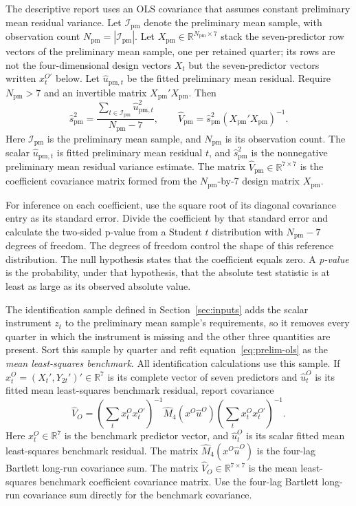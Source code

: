 \documentclass[11pt]{article}
\begin{document}
The descriptive report uses an OLS covariance that assumes constant preliminary mean residual
variance. Let \(\mathcal I_{\mathrm{pm}}\) denote the preliminary mean sample, with observation count
\(N_{\mathrm{pm}}=|\mathcal I_{\mathrm{pm}}|\). Let \(X_{\mathrm{pm}}\in\mathbb R^{N_{\mathrm{pm}}\times7}\) stack the seven-predictor row vectors of the preliminary mean
sample, one per retained quarter; its rows are not the four-dimensional design vectors \(X_t\) but
the seven-predictor vectors written \(x_t^{O\prime}\) below.
Let \(\widehat u_{\mathrm{pm},t}\) be the fitted preliminary mean residual. Require
\(N_{\mathrm{pm}}>7\) and an invertible matrix \(X_{\mathrm{pm}}'X_{\mathrm{pm}}\). Then
\begin{equation*}
 \widehat s_{\mathrm{pm}}^2=\frac{\sum_{t\in\mathcal I_{\mathrm{pm}}}\widehat u_{\mathrm{pm},t}^2}{N_{\mathrm{pm}}-7},
 \qquad
 \widehat V_{\mathrm{pm}}=\widehat s_{\mathrm{pm}}^2(X_{\mathrm{pm}}'X_{\mathrm{pm}})^{-1}.
\end{equation*}
Here \(\mathcal I_{\mathrm{pm}}\) is the preliminary mean sample, and \(N_{\mathrm{pm}}\) is its observation count. The
scalar \(\widehat u_{\mathrm{pm},t}\) is fitted preliminary mean residual \(t\), and \(\widehat s_{\mathrm{pm}}^2\) is
the nonnegative preliminary mean residual variance estimate. The matrix
\(\widehat V_{\mathrm{pm}}\in\mathbb R^{7\times7}\) is the coefficient covariance matrix formed from the
\(N_{\mathrm{pm}}\)-by-7 design matrix \(X_{\mathrm{pm}}\).

For inference on each coefficient, use the square root of its diagonal covariance entry as its
standard error. Divide the coefficient by that standard error and calculate the two-sided p-value
from a Student \(t\) distribution with \(N_{\mathrm{pm}}-7\) degrees of freedom. The degrees of freedom control
the shape of this reference distribution. The null hypothesis states that the coefficient equals
zero. A \emph{p-value} is the probability, under that hypothesis, that the absolute test statistic
is at least as large as its observed absolute value.

The identification sample defined in Section~\ref{sec:inputs} adds the scalar instrument \(z_t\) to
the preliminary mean sample's requirements, so it
removes every quarter in which the instrument is missing and the other three quantities are present. Sort this sample by quarter and refit
equation~\eqref{eq:prelim-ols} as the \emph{mean least-squares benchmark}. All identification
calculations use this sample. If
\(x_t^{O}=(X_t',Y_{2t}')'\in\mathbb R^7\) is its complete vector of seven predictors and
\(\widehat u_t^{O}\) is its fitted mean least-squares benchmark residual, report covariance
\[
\widehat V_O=
 \left(\sum_tx_t^Ox_t^{O\prime}\right)^{-1}
 \widehat M_4(x^O\widehat u^O)
 \left(\sum_tx_t^Ox_t^{O\prime}\right)^{-1}.
\]
Here \(x_t^O\in\mathbb R^7\) is the benchmark predictor vector, and \(\widehat u_t^O\) is its
scalar fitted mean least-squares benchmark residual. The matrix \(\widehat M_4(x^O\widehat u^O)\) is the four-lag Bartlett
long-run covariance sum. The matrix \(\widehat V_O\in\mathbb R^{7\times7}\) is the mean
least-squares benchmark coefficient covariance matrix.
Use the four-lag Bartlett long-run covariance sum directly for the benchmark covariance.
\end{document}
